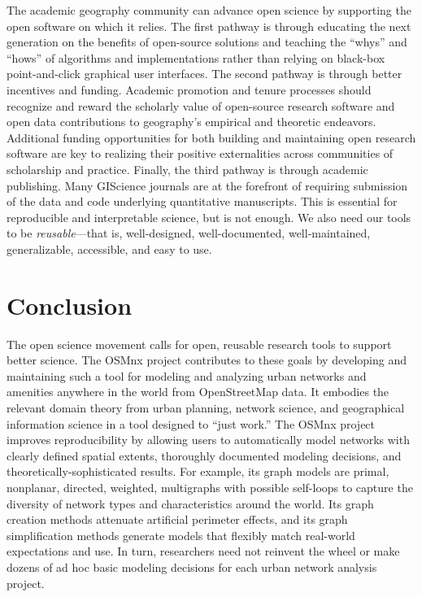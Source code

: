 \documentclass[12pt,letterpaper]{article} %
\begin{document}
The academic geography community can advance open science by supporting the open software on which it relies. The first pathway is through educating the next generation on the benefits of open-source solutions and teaching the \enquote{whys} and \enquote{hows} of algorithms and implementations rather than relying on black-box point-and-click graphical user interfaces. The second pathway is through better incentives and funding. Academic promotion and tenure processes should recognize and reward the scholarly value of open-source research software and open data contributions to geography's empirical and theoretic endeavors. Additional funding opportunities for both building and maintaining open research software are key to realizing their positive externalities across communities of scholarship and practice. Finally, the third pathway is through academic publishing. Many GIScience journals are at the forefront of requiring submission of the data and code underlying quantitative manuscripts. This is essential for reproducible and interpretable science, but is not enough. We also need our tools to be \textit{reusable}---that is, well-designed, well-documented, well-maintained, generalizable, accessible, and easy to use.

\section{Conclusion}

The open science movement calls for open, reusable research tools to support better science. The OSMnx project contributes to these goals by developing and maintaining such a tool for modeling and analyzing urban networks and amenities anywhere in the world from OpenStreetMap data. It embodies the relevant domain theory from urban planning, network science, and geographical information science in a tool designed to \enquote{just work.} The OSMnx project improves reproducibility by allowing users to automatically model networks with clearly defined spatial extents, thoroughly documented modeling decisions, and theoretically-sophisticated results. For example, its graph models are primal, nonplanar, directed, weighted, multigraphs with possible self-loops to capture the diversity of network types and characteristics around the world. Its graph creation methods attenuate artificial perimeter effects, and its graph simplification methods generate models that flexibly match real-world expectations and use. In turn, researchers need not reinvent the wheel or make dozens of ad hoc basic modeling decisions for each urban network analysis project.
\end{document}
